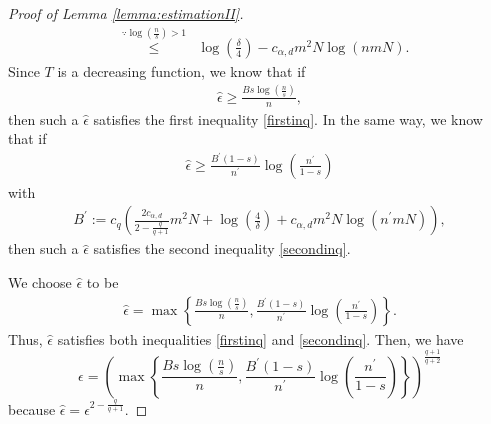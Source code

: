 \documentclass[10pt,a4paper]{amsart}
\begin{document}
\begin{proof}[Proof of Lemma \ref{lemma:estimationII}]
\begin{eqnarray*}
&\stackrel{\because \log (\frac{n}{s}) > 1}{\leq}& \log \left(\frac{\delta}{4}\right) -  c_{\alpha, d} m^2  N\log(nmN). 
\end{eqnarray*}
Since $T$ is a decreasing function, we know that if
\begin{eqnarray*}
  \hat \epsilon \geq  \frac{Bs\log \left(\frac{n}{s}\right)}{n}
,
\end{eqnarray*}
then such a $\hat \epsilon$ satisfies the first inequality \eqref{firstinq}.
In the same way, we know that if
\begin{eqnarray*}
    \hat\epsilon \geq \frac{B^\prime(1-s)}{n^\prime}\log \left(\frac{n^\prime}{1-s}\right)
\end{eqnarray*}
with \begin{eqnarray*}
    B^\prime:=c_{q} \left(\frac{2c_{\alpha, d}}{2-{\frac{q}{q+1}}} m^2 N + \log \left(\frac{4}{\delta}\right) + c_{\alpha, d} m^2 N\log(n^\prime mN)\right),  
\end{eqnarray*}
then such a $\hat\epsilon$ satisfies the second inequality \eqref{secondinq}.

We choose $\hat \epsilon$ to be  
\begin{eqnarray*}
   \hat\epsilon =  \max \left\{  \frac{Bs\log \left(\frac{n}{s}\right)}{n}
, \frac{B^\prime(1-s)}{n^\prime}\log \left(\frac{n^\prime}{1-s}\right) \right\}.
\end{eqnarray*}
Thus, $\hat\epsilon $ satisfies both inequalities \eqref{firstinq} and \eqref{secondinq}. Then, we have  \begin{equation}\label{choice_of_epsilon}
    \epsilon =   \left(\max\left\{  \frac{Bs\log \left(\frac{n}{s}\right)}{n}
, \frac{B^\prime(1-s)}{n^\prime}\log \left(\frac{n^\prime}{1-s}\right) \right\}\right)^{\frac{q+1}{q+2} }
\end{equation}
because $\hat \epsilon = \epsilon^{2-{\frac{q}{q+1}}}$.


\end{proof}
\end{document}
